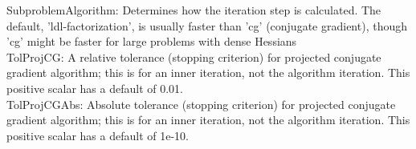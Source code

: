 \documentclass[10pt]{article}
\begin{document}
SubproblemAlgorithm: Determines how the iteration step is calculated. The default, 'ldl-factorization', is usually faster than 'cg' (conjugate gradient), though 'cg' might be faster for large problems with dense Hessians\\

TolProjCG: A relative tolerance (stopping criterion) for projected conjugate gradient algorithm; this is for an inner iteration, not the algorithm iteration. This positive scalar has a default of 0.01.\\

TolProjCGAbs: Absolute tolerance (stopping criterion) for projected conjugate gradient algorithm; this is for an inner iteration, not the algorithm iteration. This positive scalar has a default of 1e-10.\\
\end{document}
